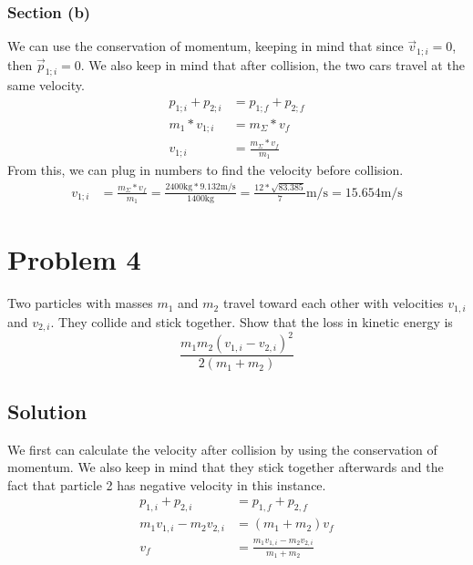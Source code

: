 \documentclass[12pt]{article}
\begin{document}
\subsubsection*{Section (b)}
We can use the conservation of momentum, keeping in mind that since $\vec{v}_{1;i} = 0$, then \(\vec{p}_{1;i} = 0\). We also keep in mind that after collision, the two cars travel at the same velocity.
\begin{align*}
    p_{1;i} + p_{2;i} &= p_{1;f} + p_{2;f}\\
    m_1*v_{1;i} &=  m_\Sigma * v_f\\
    v_{1;i} &=  \frac{m_\Sigma * v_f}{m_1}
\end{align*}
From this, we can plug in numbers to find the velocity before collision.
\begin{align*}
    v_{1;i} &=  \frac{m_\Sigma * v_f}{m_1}
        =   \frac{2400\unit{\kilo\gram} * 9.132\unit{\meter/\second}}{1400\unit{\kilo\gram}}
        =   \boxed{\frac{12*\sqrt{83.385}}{7}\unit{\meter/\second} = 15.654\unit{\meter/\second}}
\end{align*}


\pagebreak
\section*{Problem 4}
Two particles with masses $m_1$ and $m_2$ travel toward each other with velocities $v_{1,i}$ and $v_{2,i}$. They collide and stick together. Show that the loss in kinetic energy is
\[ \frac{m_1 m_2 \left(v_{1,i} - v_{2,i}\right)^2}{2(m_1 + m_2)} \]

\subsection*{Solution}
We first can calculate the velocity after collision by using the conservation of momentum. We also keep in mind that they stick together afterwards and the fact that particle 2 has negative velocity in this instance.
\begin{align*}
    p_{1,i} + p_{2,i} &=  p_{1,f} + p_{2,f}\\
    m_1 v_{1,i} - m_2 v_{2,i} &=  (m_1 + m_2) v_f\\
    v_f &=  \frac{m_1 v_{1,i} - m_2 v_{2,i}}{m_1 + m_2}
\end{align*}
\end{document}
